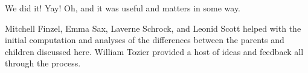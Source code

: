 We did it! Yay! Oh, and it was useful and matters in some way.

\begin{acknowledgement}
	Mitchell Finzel, Emma Sax, Laverne Schrock, and Leonid Scott helped 
	with the initial computation and analyses of the differences between the 
	parents and children discussed here. William Tozier provided a host of 
	ideas and feedback all through the process.
\end{acknowledgement}



